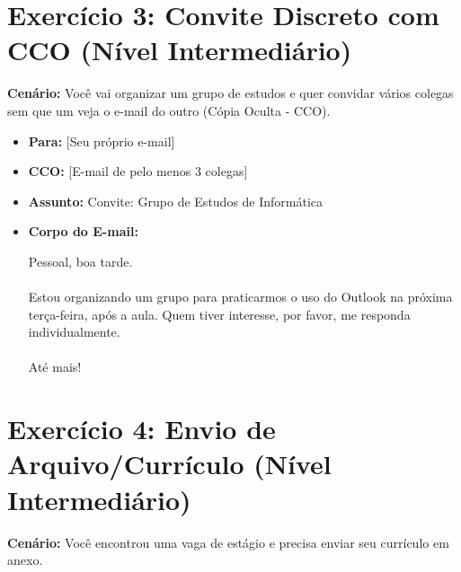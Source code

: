 \documentclass[12pt,a4paper]{article}
\begin{document}
\newpage

\section*{Exercício 3: Convite Discreto com CCO (Nível Intermediário)}

\textbf{Cenário:} Você vai organizar um grupo de estudos e quer convidar vários colegas sem que um veja o e-mail do outro (Cópia Oculta - CCO).

\begin{itemize}[label=$\square$]
    \item \textbf{Para:} [Seu próprio e-mail]
    \item \textbf{CCO:} [E-mail de pelo menos 3 colegas]
    \item \textbf{Assunto:} Convite: Grupo de Estudos de Informática
    \item \textbf{Corpo do E-mail:}
    \begin{tcolorbox}[colback=gray!5, colframe=gray!50]
        Pessoal, boa tarde.\\
        \\
        Estou organizando um grupo para praticarmos o uso do Outlook na próxima terça-feira, após a aula. Quem tiver interesse, por favor, me responda individualmente.\\
        \\
        Até mais!
    \end{tcolorbox}
\end{itemize}

\section*{Exercício 4: Envio de Arquivo/Currículo (Nível Intermediário)}

\textbf{Cenário:} Você encontrou uma vaga de estágio e precisa enviar seu currículo em anexo.
\end{document}

